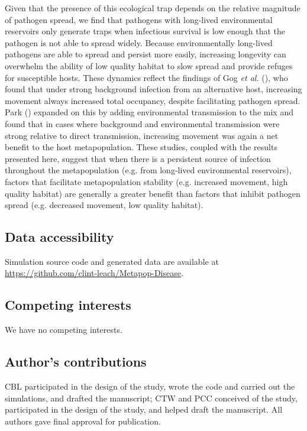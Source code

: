 \documentclass{article}
\begin{document}
Given that the presence of this ecological trap depends on the relative magnitude of pathogen spread, we find that pathogens with long-lived environmental reservoirs only generate traps when infectious survival is low enough that the pathogen is not able to spread widely.
Because environmentally long-lived pathogens are able to spread and persist more easily, increasing longevity can overwhelm the ability of low quality habitat to slow spread and provide refuges for susceptible hosts.
These dynamics reflect the findings of Gog \emph{et al.} (\cite{Gog2002}), who found that under strong background infection from an alternative host, increasing movement always increased total occupancy, despite facilitating pathogen spread.  
Park (\cite{Park2012}) expanded on this by adding environmental transmission to the mix and found that in cases where background and environmental transmission were strong relative to direct transmission, increasing movement was again a net benefit to the host metapopulation.  
These studies, coupled with the results presented here, suggest that when there is a persistent source of infection throughout the metapopulation (e.g. from long-lived environmental reservoirs), factors that facilitate metapopulation stability (e.g. increased movement, high quality habitat) are generally a greater benefit than factors that inhibit pathogen spread (e.g. decreased movement, low quality habitat). 


\subsection*{Data accessibility}
Simulation source code and generated data are available at \\  \url{https://github.com/clint-leach/Metapop-Disease}.

\subsection*{Competing interests}
We have no competing interests.

\subsection*{Author's contributions}
CBL participated in the design of the study, wrote the code and carried out the simulations, and drafted the manuscript; CTW and PCC conceived of the study, participated in the design of the study, and helped draft the manuscript.  All authors gave final approval for publication.
\end{document}

